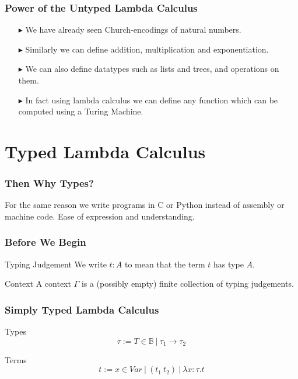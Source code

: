 \documentclass[14pt,compress]{beamer}
\begin{document}
\begin{frame}\label{frame : power of lambda}
\frametitle{Power of the Untyped Lambda Calculus}
\begin{enumerate}
\pause
\item[$\blacktriangleright$] We have already seen Church-encodings of natural numbers.
\pause
\item[$\blacktriangleright$] Similarly we can define addition, multiplication and exponentiation.
\pause
\item[$\blacktriangleright$] We can also define datatypes such as lists and trees, and operations on them.
\pause
\item[$\blacktriangleright$] In fact using lambda calculus we can define any function
which can be computed using a Turing Machine.
\end{enumerate}
\end{frame}

\section{Typed Lambda Calculus}
\begin{frame}\label{frame : why types}
\frametitle{Then Why Types?}
For the same reason we write programs in C or Python instead of assembly or machine code.
Ease of expression and understanding. 
\end{frame}
\begin{frame}\label{frame : before we begin}
\frametitle{Before We Begin}

\begin{block}{Typing Judgement}
We write $t : A$ to mean that the term $t$ has type $A$.
\end{block}

\begin{block}{Context}
A context $\Gamma$ is a (possibly empty) finite collection of typing judgements.
\end{block}

\end{frame}
\begin{frame}\label{frame : terms and types of simply typed lambda calculus}
\frametitle{Simply Typed Lambda Calculus}

\begin{block}{Types}
\[ \tau := T\in \mathbb{B}\ |\ \tau _1 \to \tau _2 \] 
\end{block}

\begin{block}{Terms}
\[ t := x \in Var\ |\ (t_1\ t_2)\ |\ \lambda x{:}\tau.t \]
\end{block}
\end{frame}
\end{document}
